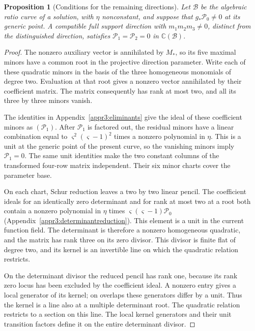 \documentclass[11pt,a4paper]{article}
\numberwithin{equation}{section}
\theoremstyle{plain}
\newtheorem{proposition}[theorem]{Proposition}
\theoremstyle{definition}
\theoremstyle{remark}
\begin{document}
\begin{proposition}[Conditions for the remaining directions]
\label{r3:directioneliminants}
Let $\mathscr B$ be the algebraic ratio curve of a
solution, with $\eta$ nonconstant, and suppose that
$g_*\mathcal P_0\ne0$ at its generic point. A compatible full
support direction with $m_1m_2m_3\ne0$, distinct from the
distinguished direction, satisfies $\mathcal P_1=\mathcal P_2=0$
in $\mathbb C(\mathscr B)$.
\end{proposition}
\begin{proof}
The nonzero auxiliary vector is annihilated by $M_*$, so its
five maximal minors have a common root in the projective
direction parameter. Write each of these quadratic minors in
the basis of the three homogeneous monomials of degree two.
Evaluation at that root gives a nonzero vector annihilated by
their coefficient matrix. The matrix consequently has rank at
most two, and all its three by three minors vanish.

The identities in Appendix~\ref{appr3:eliminants} give the
ideal of these coefficient minors as $(\mathcal P_1)$.
After $\mathcal P_1$ is factored out, the residual minors have
a linear combination equal to
$\varsigma^2(\varsigma-1)^2$ times a nonzero polynomial in
$\eta$. This is a unit at the generic point of the present
curve, so the vanishing minors imply $\mathcal P_1=0$.
The same unit identities make the two constant columns of the
transformed four-row matrix independent. Their six minor charts
cover the parameter base.

On each chart, Schur reduction leaves a two by two linear pencil.
The coefficient ideals for an identically zero determinant and
for rank at most two at a root both contain a nonzero polynomial
in $\eta$ times $\varsigma(\varsigma-1)\mathcal P_0$
(Appendix~\ref{appr3:determinantreduction}).
This element is a unit in the current function field.
The determinant is therefore a nonzero homogeneous quadratic,
and the matrix has rank three on its zero divisor. This divisor
is finite flat of degree two, and its kernel is an invertible line
on which the quadratic relation restricts.

On the determinant divisor the reduced pencil has rank one,
because its rank zero locus has been excluded by the coefficient
ideal. A nonzero entry gives a local generator of its kernel;
on overlaps these generators differ by a unit. Thus the kernel
is a line also at a multiple determinant root. The quadratic
relation restricts to a section on this line. The local kernel
generators and their unit transition factors define it on the
entire determinant divisor.


\end{proof}
\end{document}
